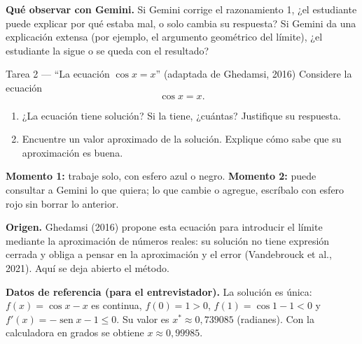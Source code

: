 \documentclass[11pt,letterpaper]{article}
\DeclareMathOperator{\seno}{sen}
\begin{document}
\noindent\textbf{Qué observar con Gemini.} Si Gemini corrige el razonamiento 1, ¿el estudiante puede explicar por qué estaba mal, o solo cambia su respuesta? Si Gemini da una explicación extensa (por ejemplo, el argumento geométrico del límite), ¿el estudiante la sigue o se queda con el resultado?

\bigskip
\begin{tarea}{Tarea 2 --- ``La ecuación $\cos x = x$'' (adaptada de Ghedamsi, 2016)}
Considere la ecuación
\[
\cos x = x .
\]
\begin{enumerate}[label=\alph*)]
  \item ¿La ecuación tiene solución? Si la tiene, ¿cuántas? Justifique su respuesta.
  \item Encuentre un valor aproximado de la solución. Explique cómo sabe que su aproximación es buena.
\end{enumerate}
\small\textbf{Momento 1:} trabaje solo, con esfero azul o negro. \textbf{Momento 2:} puede consultar a Gemini lo que quiera; lo que cambie o agregue, escríbalo con esfero rojo sin borrar lo anterior.
\end{tarea}

\noindent\textbf{Origen.} Ghedamsi (2016) propone esta ecuación para introducir el límite mediante la aproximación de números reales: su solución no tiene expresión cerrada y obliga a pensar en la aproximación y el error (Vandebrouck et al., 2021). Aquí se deja abierto el método.

\noindent\textbf{Datos de referencia (para el entrevistador).} La solución es única: $f(x)=\cos x - x$ es continua, $f(0)=1>0$, $f(1)=\cos 1 - 1<0$ y $f'(x)=-\seno x-1\le 0$. Su valor es $x^*\approx 0{,}739085$ (radianes). Con la calculadora en grados se obtiene $x\approx 0{,}99985$.
\end{document}
